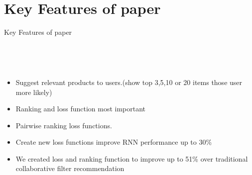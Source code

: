 \documentclass{beamer}
\begin{document}
\section{Key Features of paper}
\begin{frame}{Key Features of paper}
    \begin{columns}[t]
      \begin{column}{0.8\textwidth}
         \begin{block}{}
         
         \\~\\
             \begin{itemize}
              \item Suggest relevant products to users.(show top 3,5,10 or 20 items those user more likely)

              \item Ranking and loss function most important

              \item Pairwise ranking loss functions.
              \item Create new loss functions improve RNN performance up to 30\%
              
              \item We created loss and ranking function to improve up to 51\% over traditional collaborative filter recommendation



              \end{itemize}   
         \end{block}
      \end{column}
      
    \end{columns}
\end{frame} 
\end{document}
